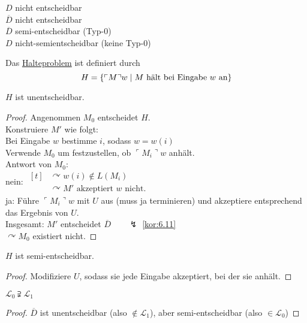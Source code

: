 $D$ \quad nicht entscheidbar\\
$\overline{D}$ \quad nicht entscheidbar\\
$\overline{D}$ \quad semi-entscheidbar (Typ-0)\\
$D$ \quad nicht-semientscheidbar (keine Typ-0)
\begin{Def}[name={[Halteproblem]}]
	Das \underline{Halteproblem} ist definiert durch
	\[H = \{\ulcorner M\urcorner w \mid M \text{ hält bei Eingabe } w \text{ an}\} \qedhere\]
\end{Def}
\begin{Satz}[name={[$H$ ist unentscheidbar]}]\label{satz:H ist unentscheidbar}
	$H$ ist unentscheidbar.
\end{Satz}
\begin{proof}
	Angenommen $M_0$ entscheidet $H$.\\
	Konstruiere $M'$ wie folgt:\\
	Bei Eingabe $w$ bestimme $i$, sodass $w = w(i)$\\
	Verwende $M_0$ um festzustellen, ob $\ulcorner M_i\urcorner w$ anhält.\\
	Antwort von $M_0:$\\
	nein: $\begin{aligned}[t]
		&\curvearrowright w(i) \notin L(M_i)\\
		&\curvearrowright M'\text{ akzeptiert }w\text{ nicht}.
	\end{aligned}$\\
	ja: Führe $\ulcorner M_i\urcorner w$ mit $U$ aus (muss ja terminieren) und akzeptiere entsprechend das Ergebnis von $U$.\\
	Insgesamt: $M'$ entscheidet $\overline{D} \qquad \lightning$ \autoref{kor:6.11}\\
	$\curvearrowright M_0$ existiert nicht.
\end{proof}
\begin{Satz}[name={[$H$ ist semi-entscheidbar]}]
	$H$ ist semi-entscheidbar.
\end{Satz}
\begin{proof}
	Modifiziere $U$, sodass sie jede Eingabe akzeptiert, bei der sie anhält.
\end{proof}
\begin{Korollar}
	$\mathcal{L}_0 \supsetneqq \mathcal{L}_1$
\end{Korollar}
\begin{proof}
	$\overline{D}$ ist unentscheidbar (also $\notin \mathcal{L}_1$), aber semi-entscheidbar (also $\in \mathcal{L}_0$)
\end{proof}
